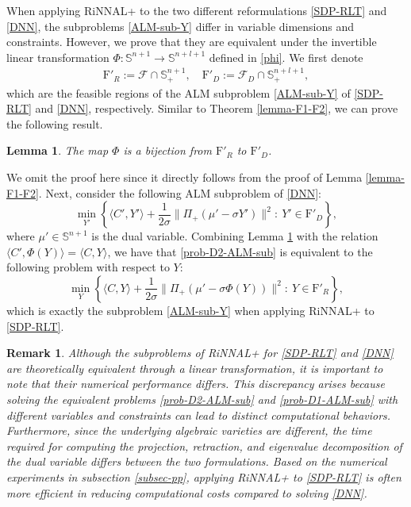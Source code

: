 \documentclass[11pt]{article}
\theoremstyle{plain}
\newtheorem{remark}{Remark}
\newtheorem{lemma}{Lemma}
\def\<{\big\langle}
\def\>{\big\rangle}
\def\F{\mathcal{F}}
\def\S{\mathbb{S}}
\begin{document}
When applying RiNNAL+ to the two different reformulations \eqref{SDP-RLT} and \eqref{DNN}, the subproblems \eqref{ALM-sub-Y} differ in variable dimensions and constraints. However, we prove that they are equivalent under the invertible linear transformation $\Phi:\S^{n+1}\rightarrow\S^{n+l+1}$ defined in \eqref{phi}. We first denote
%
\begin{equation*}
\begin{aligned}
{\mathrm{F}'_R}:=\F\cap \mathbb{S}_{+}^{n+1},\quad 
{\mathrm{F}'_D}:=\F_D\cap \mathbb{S}_{+}^{n+l+1},
\end{aligned}
\end{equation*}
%
which are the feasible regions of the ALM subproblem \eqref{ALM-sub-Y} of \eqref{SDP-RLT} and \eqref{DNN}, respectively.
Similar to Theorem \ref{lemma-F1-F2}, we can prove the following result.
\begin{lemma}\label{lemma-F1F2sub}
    The map $\Phi$ is a bijection from ${\mathrm{F}'_R}$ to ${\mathrm{F}'_D}$.
\end{lemma}
We omit the proof here since it directly follows from the proof of Lemma \ref{lemma-F1-F2}. 
Next, consider the following ALM subproblem of \eqref{DNN}:
\begin{equation}
\label{prob-D2-ALM-sub}
\min_{Y'}\left\{\<C',Y'\>+\frac{1}{2\sigma}\|\Pi_+(\mu'-\sigma Y')\|^2:\ Y'\in {\mathrm{F}'_D}\right\},
\end{equation}
where $\mu'\in\S^{n+1}$ is the dual variable. 
Combining Lemma \ref{lemma-F1F2sub} with the relation $\langle C',\Phi(Y)\rangle=\langle C,Y\rangle$, we have that 
\eqref{prob-D2-ALM-sub} is equivalent to the following problem with respect to $Y$:
\begin{equation}
\label{prob-D1-ALM-sub}
\min_{Y}\left\{\<C,Y\>+\frac{1}{2\sigma}\|\Pi_+(\mu'-\sigma \Phi(Y))\|^2:\ Y\in {\mathrm{F}'_R} \right\}, 
\end{equation}
which is exactly the subproblem \eqref{ALM-sub-Y} when applying RiNNAL+ to \eqref{SDP-RLT}. 
\begin{remark}
Although the subproblems of RiNNAL+ for \eqref{SDP-RLT} and \eqref{DNN} are theoretically equivalent through a linear transformation, it is important to note that their numerical performance differs. This discrepancy arises because solving the equivalent problems \eqref{prob-D2-ALM-sub} and \eqref{prob-D1-ALM-sub} with different variables and constraints can lead to distinct computational behaviors. Furthermore, since the underlying algebraic varieties are different, the time required for computing the projection, retraction, and eigenvalue decomposition of the dual variable differs between the two formulations. Based on the numerical experiments in subsection \ref{subsec-pp}, applying RiNNAL+ to \eqref{SDP-RLT} is often more efficient in reducing computational costs compared to solving \eqref{DNN}.
\end{remark}
\end{document}
